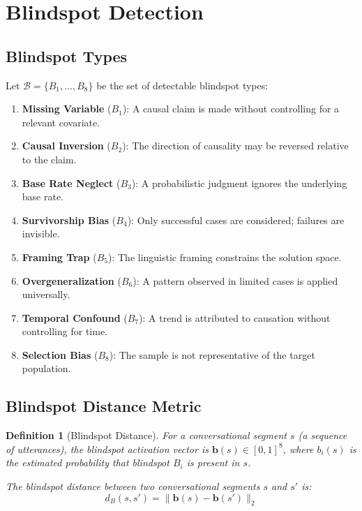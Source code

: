 \documentclass[12pt,a4paper]{article}
\newtheorem{definition}{Definition}[section]
\theoremstyle{remark}
\begin{document}
\section{Blindspot Detection}

\subsection{Blindspot Types}

Let $\mathcal{B} = \{B_1, \ldots, B_8\}$ be the set of detectable blindspot types:

\begin{enumerate}
    \item \textbf{Missing Variable} ($B_1$): A causal claim is made without controlling for a relevant covariate.
    \item \textbf{Causal Inversion} ($B_2$): The direction of causality may be reversed relative to the claim.
    \item \textbf{Base Rate Neglect} ($B_3$): A probabilistic judgment ignores the underlying base rate.
    \item \textbf{Survivorship Bias} ($B_4$): Only successful cases are considered; failures are invisible.
    \item \textbf{Framing Trap} ($B_5$): The linguistic framing constrains the solution space.
    \item \textbf{Overgeneralization} ($B_6$): A pattern observed in limited cases is applied universally.
    \item \textbf{Temporal Confound} ($B_7$): A trend is attributed to causation without controlling for time.
    \item \textbf{Selection Bias} ($B_8$): The sample is not representative of the target population.
\end{enumerate}

\subsection{Blindspot Distance Metric}

\begin{definition}[Blindspot Distance]
For a conversational segment $s$ (a sequence of utterances), the blindspot activation vector is $\mathbf{b}(s) \in [0,1]^8$, where $b_i(s)$ is the estimated probability that blindspot $B_i$ is present in $s$.

The blindspot distance between two conversational segments $s$ and $s'$ is:
\begin{equation}
d_B(s, s') = \|\mathbf{b}(s) - \mathbf{b}(s')\|_2
\end{equation}
\end{definition}
\end{document}
